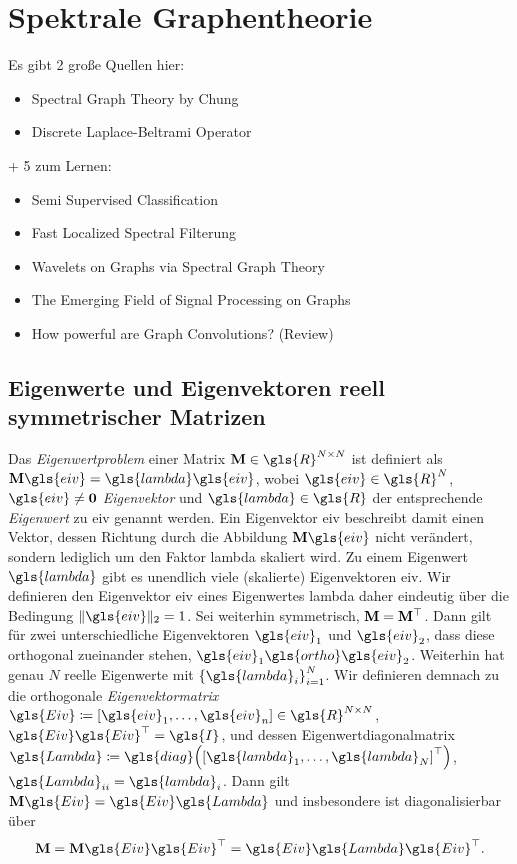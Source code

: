 \section{Spektrale Graphentheorie}
\label{spektrale_graphentheorie}

Es gibt 2 große Quellen hier:
\begin{itemize}
  \item Spectral Graph Theory by Chung
  \item Discrete Laplace-Beltrami Operator
\end{itemize}
+ 5 zum Lernen:
\begin{itemize}
  \item Semi Supervised Classification
  \item Fast Localized Spectral Filterung
  \item Wavelets on Graphs via Spectral Graph Theory
  \item The Emerging Field of Signal Processing on Graphs
  \item How powerful are Graph Convolutions? (Review)
\end{itemize}

\subsection{Eigenwerte und Eigenvektoren reell symmetrischer Matrizen}
\label{eigenwerte_symmetrischer_matrizen}

Das \emph{Eigenwertproblem} einer Matrix $\ma{M} \in \gls{R}^{N \times N}$ ist definiert als $\ma{M}\gls{eiv} = \gls{lambda}\gls{eiv}$, wobei $\gls{eiv} \in \gls{R}^{N}$, $\gls{eiv} \neq \mathbf{0}$ \emph{Eigenvektor} und $\gls{lambda} \in \gls{R}$ der entsprechende \emph{Eigenwert} zu \gls{eiv} genannt werden.
Ein Eigenvektor \gls{eiv} beschreibt damit einen Vektor, dessen Richtung durch die Abbildung $\ma{M}\gls{eiv}$ nicht verändert, sondern lediglich um den Faktor \gls{lambda} skaliert wird.
Zu einem Eigenwert $\gls{lambda}$ gibt es unendlich viele (skalierte) Eigenvektoren \gls{eiv}.
Wir definieren den Eigenvektor \gls{eiv} eines Eigenwertes \gls{lambda} daher eindeutig über die Bedingung $\left\|\gls{eiv}\right\|_2 = 1$.
Sei  weiterhin symmetrisch, \dhe{} $\mathbf{M} = \mathbf{M}^{\top}$.
Dann gilt für zwei unterschiedliche Eigenvektoren $\gls{eiv}_1$ und $\gls{eiv}_2$, dass diese orthogonal zueinander stehen, \dhe{} $\gls{eiv}_1 \gls{ortho} \gls{eiv}_2$.
Weiterhin hat  genau $N$ reelle Eigenwerte mit ${\left\{\gls{lambda}_i\right\}}_{i=1}^N$.
Wir definieren demnach zu  die orthogonale \emph{Eigenvektormatrix} $\gls{Eiv} \coloneqq \left[\gls{eiv}_1, \ldots, \gls{eiv}_n\right] \in \gls{R}^{N \times N}$, \dhe{} $\gls{Eiv}\gls{Eiv}^{\top}=\gls{I}$, und dessen Eigenwertdiagonalmatrix $\gls{Lambda} \coloneqq \gls{diag}\left({\left[\gls{lambda}_1, \ldots, \gls{lambda}_N\right]}^{\top}\right)$, \dhe{} $\gls{Lambda}_{ii} = \gls{lambda}_i$.
Dann gilt $\ma{M}\gls{Eiv} = \gls{Eiv}\gls{Lambda}$ und insbesondere ist  diagonalisierbar über
\begin{equation*}
  \ma{M} = \ma{M}\gls{Eiv}\gls{Eiv}^{\top} = \gls{Eiv}\gls{Lambda}\gls{Eiv}^{\top}.
\end{equation*}

